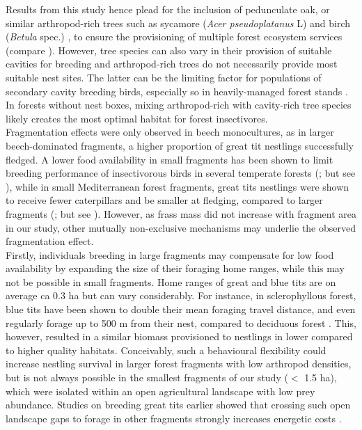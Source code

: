 \documentclass[10pt, twoside]{book} %
\begin{document}
	Results from this study hence plead for the inclusion of pedunculate oak, or similar arthropod-rich trees such as sycamore (\textit{Acer pseudoplatanus} L) and birch (\textit{Betula} spec.) \citep{Shutt2018}, to ensure the provisioning of multiple forest ecosystem services (compare \citealt{VanderPlas2016}). However, tree species can also vary in their provision of suitable cavities for breeding \citep{Remm2011} and arthropod-rich trees do not necessarily provide most suitable nest sites. The latter can be the limiting factor for populations of secondary cavity breeding birds, especially so in heavily-managed forest stands \citep{Newton1994, Robles2012}. In forests without nest boxes, mixing arthropod-rich with cavity-rich tree species likely creates the most optimal habitat for forest insectivores.\\
	
	Fragmentation effects were only observed in beech monocultures, as in larger beech-dominated fragments, a higher proportion of great tit nestlings successfully fledged. A lower food availability in small fragments has been shown to limit breeding performance of insectivorous birds in several temperate forests (\citealt{Burke1998, Zanette2000}; but see \citealt{Lampila2005}), while in small Mediterranean forest fragments, great tits nestlings were shown to receive fewer caterpillars and be smaller at fledging, compared to larger fragments (\citealt{ Bueno-Enciso2016}; but see \citealt{Nour1998}). However, as frass mass did not increase with fragment area in our study, other mutually non-exclusive mechanisms may underlie the observed fragmentation effect.\\
	
	Firstly, individuals breeding in large fragments may compensate for low food availability by expanding the size of their foraging home ranges, while this may not be possible in small fragments. Home ranges of great and blue tits are on average ca 0.3 ha \citep{Naef-Daenzer1994} but can vary considerably. For instance, in sclerophyllous forest, blue tits have been shown to double their mean foraging travel distance, and even regularly forage up to 500 m from their nest, compared to deciduous forest \citep{Tremblay2005}. This, however, resulted in a similar biomass provisioned to nestlings in lower compared to higher quality habitats. Conceivably, such a behavioural flexibility could increase nestling survival in larger forest fragments with low arthropod densities, but is not always possible in the smallest fragments of our study ($<$ 1.5 ha), which were isolated within an open agricultural landscape with low prey abundance. Studies on breeding great tits earlier showed that crossing such open landscape gaps to forage in other fragments strongly increases energetic costs \citep{Hinsley2008}.\\
	
\end{document}
